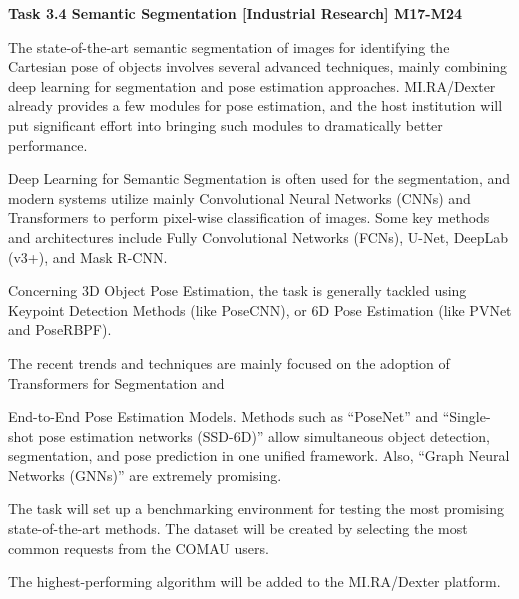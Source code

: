 \begin{planactivitybody}
\plantaskskip
\textbf{Task 3.4 Semantic Segmentation {[}Industrial Research{]}
M17-M24}

The state-of-the-art semantic segmentation of images for identifying the
Cartesian pose of objects involves several advanced techniques, mainly
combining deep learning for segmentation and pose estimation approaches.
MI.RA/Dexter already provides a few modules for pose estimation, and the
host institution will put significant effort into bringing such modules
to dramatically better performance.

Deep Learning for Semantic Segmentation is often used for the
segmentation, and modern systems utilize mainly Convolutional Neural
Networks (CNNs) and Transformers to perform pixel-wise classification of
images. Some key methods and architectures include Fully Convolutional
Networks (FCNs), U-Net, DeepLab (v3+), and Mask R-CNN.

Concerning 3D Object Pose Estimation, the task is generally tackled
using Keypoint Detection Methods (like PoseCNN), or 6D Pose Estimation
(like PVNet and PoseRBPF).

The recent trends and techniques are mainly focused on the adoption of
Transformers for Segmentation and

End-to-End Pose Estimation Models. Methods such as ``PoseNet'' and
``Single-shot pose estimation networks (SSD-6D)'' allow simultaneous
object detection, segmentation, and pose prediction in one unified
framework. Also, ``Graph Neural Networks (GNNs)'' are extremely
promising.

The task will set up a benchmarking environment for testing the most
promising state-of-the-art methods. The dataset will be created by
selecting the most common requests from the COMAU users.

The highest-performing algorithm will be added to the MI.RA/Dexter
platform.
\end{planactivitybody}


